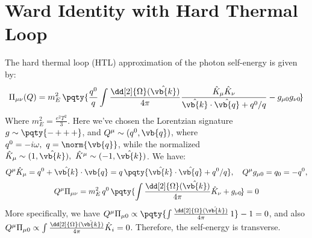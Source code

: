 \documentclass[a4paper,10pt]{article}
\begin{document}
\maketitle
\pagestyle{headings}
\thispagestyle{empty}

\vspace*{-1.5\baselineskip}

\section{Ward Identity with Hard Thermal Loop}
	The hard thermal loop (HTL) approximation of the photon self-energy is given by:
	\begin{equation}
		\Pi_{\mu\nu}(Q)
		= m^2_E\, \pqty{
			\frac{q^0}{q}
			\int \frac{\dd[2]{\Omega}(\hat{\vb{k}})}{4\pi}
				\frac{\hat{K}_\mu \hat{K}_\nu}{
					\hat{\vb{k}} \cdot\hat{\vb{q}}
					+ q^0/q
				}
			- g_{\mu 0} g_{\nu 0}\!
		}
	\end{equation}
	Where $m^2_E = \frac{e^2 T^2}{3}$. Here we've chosen the Lorentzian signature $
		g\sim\pqty{
			\mathop{-}
			\mathop{+}
			\mathop{+}
			\mathop{+}
		}
	$, and $Q^\mu \sim (q^0,\vb{q})$, where $q^0 = -i\omega,\ q = \norm{\vb{q}}$, while the normalized $\hat{K}_\mu \sim (1,\hat{\vb{k}}),\ \hat{K}^\mu \sim (-1,\hat{\vb{k}})$. We have:
	\begin{gather}
		Q^\mu \hat{K}_\mu
		= q^0 + \hat{\vb{k}} \cdot \vb{q}
		= q\,\pqty{
				\hat{\vb{k}} \cdot \hat{\vb{q}} + q^0/q
			},\quad
		Q^\mu g_{\mu 0}
		= q_0 = - q^0,\\
		Q^\mu \Pi_{\mu\nu}
		= m^2_E\, q^0\, \pqty{
			\int \frac{\dd[2]{\Omega}(\hat{\vb{k}})}{4\pi}
				\hat{K}_\nu
			+ g_{\nu 0}\!
		}
		= 0
	\end{gather}
	More specifically, we have $
		Q^\mu \Pi_{\mu0} \propto
		\pqty{
			\int \frac{\dd[2]{\Omega}(\hat{\vb{k}})}{4\pi}
				\,1
		} - 1 = 0
	$, and also $
		Q^\mu \Pi_{\mu0} \propto
		\int \frac{\dd[2]{\Omega}(\hat{\vb{k}})}{4\pi}
			\hat{K}_i
		= 0
	$. Therefore, the self-energy is transverse. 
\end{document}
